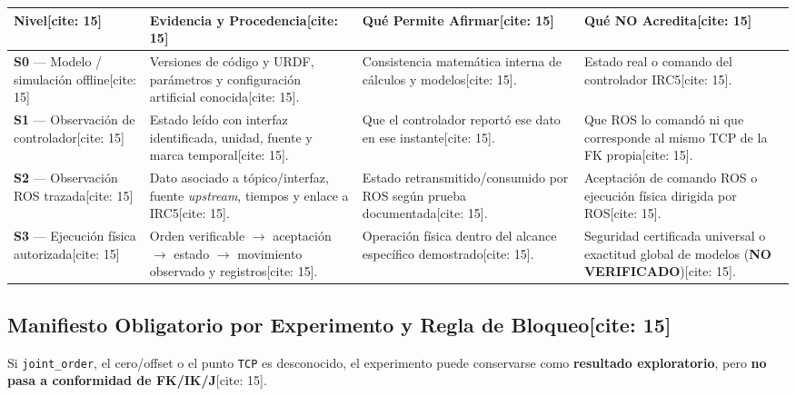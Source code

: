 \documentclass[10pt, a4paper]{article}
\begin{document}
\noindent
{\scriptsize
\renewcommand{\arraystretch}{1.3}
\noindent\begin{tabularx}{\textwidth}{|>{\hsize=0.65\hsize\raggedright\arraybackslash}X|>{\hsize=1.05\hsize\raggedright\arraybackslash}X|>{\hsize=1.15\hsize\raggedright\arraybackslash}X|>{\hsize=1.15\hsize\raggedright\arraybackslash}X|}
\hline
\rowcolor{ucbblue!15}
\textbf{Nivel}[cite: 15] & \textbf{Evidencia y Procedencia}[cite: 15] & \textbf{Qué Permite Afirmar}[cite: 15] & \textbf{Qué NO Acredita}[cite: 15] \\ \hline
\textbf{S0} — Modelo / simulación offline[cite: 15] & Versiones de código y URDF, parámetros y configuración artificial conocida[cite: 15]. & Consistencia matemática interna de cálculos y modelos[cite: 15]. & Estado real o comando del controlador IRC5[cite: 15]. \\ \hline
\textbf{S1} — Observación de controlador[cite: 15] & Estado leído con interfaz identificada, unidad, fuente y marca temporal[cite: 15]. & Que el controlador reportó ese dato en ese instante[cite: 15]. & Que ROS lo comandó ni que corresponde al mismo TCP de la FK propia[cite: 15]. \\ \hline
\textbf{S2} — Observación ROS trazada[cite: 15] & Dato asociado a tópico/interfaz, fuente \textit{upstream}, tiempos y enlace a IRC5[cite: 15]. & Estado retransmitido/consumido por ROS según prueba documentada[cite: 15]. & Aceptación de comando ROS o ejecución física dirigida por ROS[cite: 15]. \\ \hline
\textbf{S3} — Ejecución física autorizada[cite: 15] & Orden verificable $\to$ aceptación $\to$ estado $\to$ movimiento observado y registros[cite: 15]. & Operación física dentro del alcance específico demostrado[cite: 15]. & Seguridad certificada universal o exactitud global de modelos (\textbf{NO VERIFICADO})[cite: 15]. \\ \hline
\end{tabularx}
}

\subsection{Manifiesto Obligatorio por Experimento y Regla de Bloqueo[cite: 15]}
Si \texttt{joint\_order}, el cero/offset o el punto \texttt{TCP} es desconocido, el experimento puede conservarse como \textbf{resultado exploratorio}, pero \textbf{no pasa a conformidad de FK/IK/J}[cite: 15].
\end{document}
